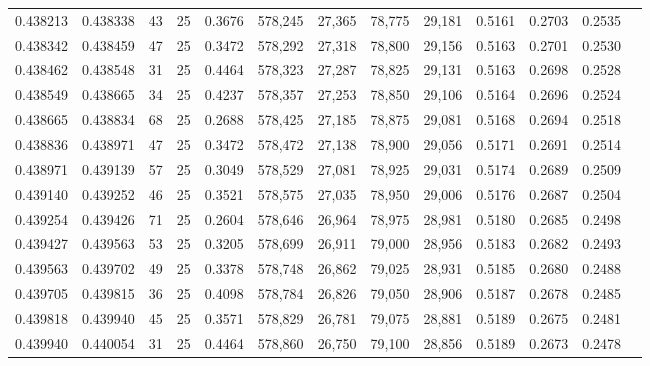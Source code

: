 \begin{tabular}{rrrrrrrrrrrrr}
0.438213 & 0.438338 &    43 &  25 &                                     0.3676 & 578,245 &  27,365 &  78,775 &  29,181 & 0.5161 & 0.2703 & 0.2535 \\
0.438342 & 0.438459 &    47 &  25 &                                     0.3472 & 578,292 &  27,318 &  78,800 &  29,156 & 0.5163 & 0.2701 & 0.2530 \\
0.438462 & 0.438548 &    31 &  25 &                                     0.4464 & 578,323 &  27,287 &  78,825 &  29,131 & 0.5163 & 0.2698 & 0.2528 \\
0.438549 & 0.438665 &    34 &  25 &                                     0.4237 & 578,357 &  27,253 &  78,850 &  29,106 & 0.5164 & 0.2696 & 0.2524 \\
0.438665 & 0.438834 &    68 &  25 &                                     0.2688 & 578,425 &  27,185 &  78,875 &  29,081 & 0.5168 & 0.2694 & 0.2518 \\
0.438836 & 0.438971 &    47 &  25 &                                     0.3472 & 578,472 &  27,138 &  78,900 &  29,056 & 0.5171 & 0.2691 & 0.2514 \\
0.438971 & 0.439139 &    57 &  25 &                                     0.3049 & 578,529 &  27,081 &  78,925 &  29,031 & 0.5174 & 0.2689 & 0.2509 \\
0.439140 & 0.439252 &    46 &  25 &                                     0.3521 & 578,575 &  27,035 &  78,950 &  29,006 & 0.5176 & 0.2687 & 0.2504 \\
0.439254 & 0.439426 &    71 &  25 &                                     0.2604 & 578,646 &  26,964 &  78,975 &  28,981 & 0.5180 & 0.2685 & 0.2498 \\
0.439427 & 0.439563 &    53 &  25 &                                     0.3205 & 578,699 &  26,911 &  79,000 &  28,956 & 0.5183 & 0.2682 & 0.2493 \\
0.439563 & 0.439702 &    49 &  25 &                                     0.3378 & 578,748 &  26,862 &  79,025 &  28,931 & 0.5185 & 0.2680 & 0.2488 \\
0.439705 & 0.439815 &    36 &  25 &                                     0.4098 & 578,784 &  26,826 &  79,050 &  28,906 & 0.5187 & 0.2678 & 0.2485 \\
0.439818 & 0.439940 &    45 &  25 &                                     0.3571 & 578,829 &  26,781 &  79,075 &  28,881 & 0.5189 & 0.2675 & 0.2481 \\
0.439940 & 0.440054 &    31 &  25 &                                     0.4464 & 578,860 &  26,750 &  79,100 &  28,856 & 0.5189 & 0.2673 & 0.2478 \\

\end{tabular}
